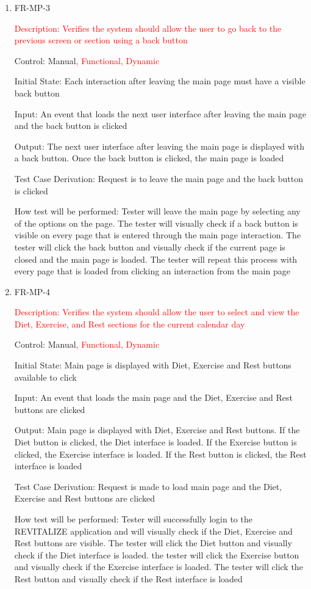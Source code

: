 \documentclass[12pt, titlepage]{article}
\begin{document}
\begin{enumerate}
	\item{FR-MP-3\\}

        \textcolor{red}{Description: Verifies the system should allow the user to go back to the previous screen or section using a back button}
	
	Control: Manual\textcolor{red}{, Functional, Dynamic}
	
	Initial State: Each interaction after leaving the main page must have a visible back button
	
	Input: An event that loads the next user interface after leaving the main page and the back button is clicked
	
	Output: The next user interface after leaving the main page is displayed with a back button. Once the back button is clicked, the main page is loaded
	
	Test Case Derivation: Request is to leave the main page and the back button is clicked
	
	How test will be performed: Tester will leave the main page by selecting any of the options on the page. The tester will visually check if a back button is visible on every page that is entered through the main page interaction. The tester will click the back button and visually check if the current page is closed and the main page is loaded. The tester will repeat this process with every page that is  loaded from clicking an interaction from the main page
	
	\item{FR-MP-4\\}

        \textcolor{red}{Description: Verifies the system should allow the user to select and view the Diet, Exercise, and Rest sections for the current calendar day}
	
	Control: Manual\textcolor{red}{, Functional, Dynamic}
	
	Initial State: Main page is displayed with Diet, Exercise and Rest buttons available to click
	
	Input: An event that loads the main page and the Diet, Exercise and Rest buttons are clicked
	
	Output: Main page is displayed with Diet, Exercise and Rest buttons. If the Diet button is clicked, the Diet interface is loaded. If the Exercise button is clicked, the Exercise interface is loaded. If the Rest button is clicked, the Rest interface is loaded
	
	Test Case Derivation: Request is made to load main page and the Diet, Exercise and Rest buttons are clicked
	
	How test will be performed: Tester will successfully login to the REVITALIZE application and will visually check if the Diet, Exercise and Rest buttons are visible. The tester will click the Diet button and visually check if the Diet interface is loaded. the tester will click the Exercise button and visually check if the Exercise interface is loaded. The tester will click the Rest button and visually check if the Rest interface is loaded
	
\end{enumerate}
\end{document}
